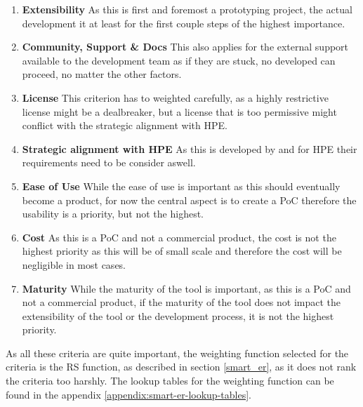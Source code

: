 \begin{enumerate}
    \item \textbf{ Extensibility } As this is first and foremost a prototyping project, the actual development it at least for the first couple steps of the highest importance. 
    \item \textbf{ Community, Support \& Docs } This also applies for the external support available to the development team as if they are stuck, no developed can proceed, no matter the other factors.
    \item \textbf{ License } This criterion has to weighted carefully, as a highly restrictive license might be a dealbreaker, but a license that is too permissive might conflict with the strategic alignment with \ac{HPE}.
    \item \textbf{ Strategic alignment with \ac{HPE} } As this is developed by and for \ac{HPE} their requirements need to be consider aswell.
    \item \textbf{ Ease of Use } While the ease of use is important as this should eventually become a product, for now the central aspect is to create a \ac{PoC} therefore the usability is a priority, but not the highest.
    \item \textbf{ Cost } As this is a \ac{PoC} and not a commercial product, the cost is not the highest priority as this will be of small scale and therefore the cost will be negligible in most cases.
    \item \textbf{ Maturity } While the maturity of the tool is important, as this is a \ac{PoC} and not a commercial product, if the maturity of the tool does not impact the extensibility of the tool or the development process, it is not the highest priority.
\end{enumerate}

As all these criteria are quite important, the weighting function selected for the criteria is the \ac{RS} function, as described in section \ref{smart_er}, 
as it does not rank the criteria too harshly.
The lookup tables for the weighting function can be found in the appendix \ref{appendix:smart-er-lookup-tables}.

